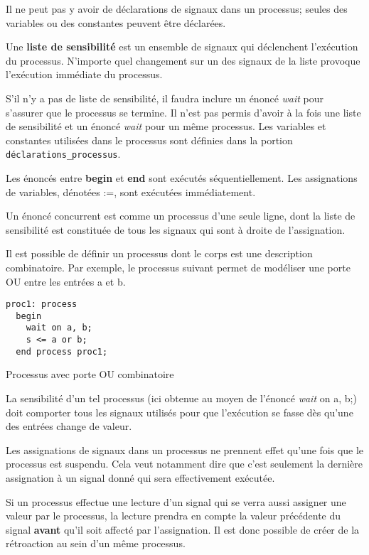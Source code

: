 \documentclass[11pt]{article}
\begin{document}
Il ne peut pas y avoir de déclarations de signaux dans un processus;
seules des variables ou des constantes peuvent être déclarées.

Une \textbf{liste de sensibilité} est un ensemble de signaux qui déclenchent
l'exécution du processus. N'importe quel changement sur un des signaux
de la liste provoque l'exécution immédiate du processus.

S'il n'y a pas de liste de sensibilité, il faudra inclure un énoncé
\emph{wait} pour s'assurer que le processus se termine. Il n'est pas permis
d'avoir à la fois une liste de sensibilité et un énoncé \emph{wait} pour un
même processus. Les variables et constantes utilisées dans le
processus sont définies dans la portion \texttt{déclarations\_processus}. 

Les énoncés entre \textbf{begin} et \textbf{end} sont exécutés séquentiellement. Les
assignations de variables, dénotées :=, sont exécutées immédiatement. 

Un énoncé concurrent est comme un processus d'une seule ligne, dont la
liste de sensibilité est constituée de tous les signaux qui sont à
droite de l'assignation.

Il est possible de définir un processus dont le corps est une
description combinatoire. Par exemple, le processus suivant permet de
modéliser une porte OU entre les entrées a et b. 

\begin{listing}[htbp]
\begin{verbatim}
proc1: process
  begin
    wait on a, b;
    s <= a or b;
  end process proc1;
\end{verbatim}
\caption{Processus avec porte OU combinatoire}
\end{listing}

La sensibilité d'un tel processus (ici obtenue au moyen de l'énoncé
\emph{wait} on a, b;) doit comporter tous les signaux utilisés pour que
l'exécution se fasse dès qu'une des entrées change de valeur.

Les assignations de signaux dans un processus ne prennent effet qu'une
fois que le processus est suspendu. Cela veut notamment dire que c'est
seulement la dernière assignation à un signal donné qui sera
effectivement exécutée.

Si un processus effectue une lecture d'un signal qui se verra aussi
assigner une valeur par le processus, la lecture prendra en compte la
valeur précédente du signal \textbf{avant} qu'il soit affecté par
l'assignation. Il est donc possible de créer de la rétroaction au sein
d'un même processus.
\end{document}
